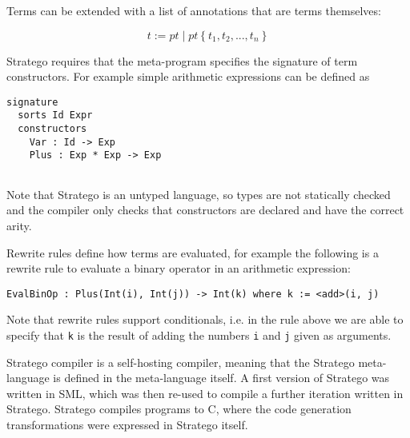 \noindent
Terms can be extended with a list of annotations that are terms themselves:

\begin{equation*}
t := pt \; | \; pt\left\lbrace t_{1},t_{2},...,t_{n} \right\rbrace
\end{equation*}

\noindent
Stratego requires that the meta-program specifies the signature of term constructors. For example simple arithmetic expressions can be defined as

\begin{lstlisting}
signature
  sorts Id Expr
  constructors
    Var : Id -> Exp
    Plus : Exp * Exp -> Exp
    
\end{lstlisting}

\noindent
Note that Stratego is an untyped language, so types are not statically checked and the compiler only checks that constructors are declared and have the correct arity.

Rewrite rules define how terms are evaluated, for example the following is a rewrite rule to evaluate a binary operator in an arithmetic expression:

\begin{lstlisting}
EvalBinOp : Plus(Int(i), Int(j)) -> Int(k) where k := <add>(i, j)
\end{lstlisting}

\noindent
Note that rewrite rules support conditionals, i.e. in the rule above we are able to specify that \texttt{k} is the result of adding the numbers \texttt{i} and \texttt{j} given as arguments.

Stratego compiler is a self-hosting compiler, meaning that the Stratego meta-language is defined in the meta-language itself. A first version of Stratego was written in SML, which was then re-used to compile a further iteration written in Stratego. Stratego compiles programs to C, where the code generation transformations were expressed in Stratego itself.


